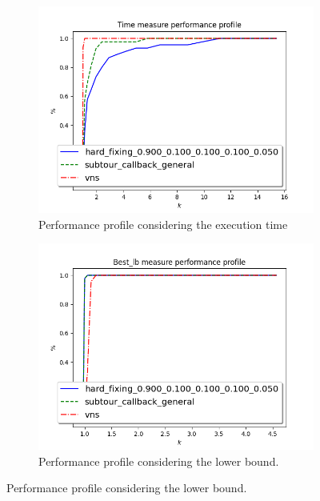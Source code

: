 \begin{figure}[!h]
\begin{subfigure}{.5\columnwidth}
		\label{fig:d2103_16}
	\end{subfigure}
	\begin{subfigure}{.5\columnwidth}
		\centering
		\includegraphics[width=\columnwidth]{../res/Lsubtour_hardfixing_vns_time.png}
		\caption{Performance profile considering the execution time}
		\label{fig:Lsubtour_hardfixing_vns_time}
	\end{subfigure}
\hfill
	\begin{subfigure}{.5\columnwidth}
		\centering
		\includegraphics[width=\columnwidth]{../res/Lsubtour_hardfixing_vns_lb.png}
		\caption{Performance profile considering the lower bound.}
		\label{fig:Lsubtour_hardfixing_vns_lb}
	\end{subfigure}
\end{figure}

